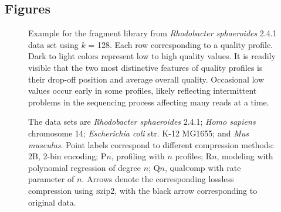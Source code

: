 \documentclass{bmcart}
\begin{document}
\begin{backmatter}



\section*{Figures}
\begin{figure}[h!]
\caption{ Example for the fragment library from
  \textit{Rhodobacter sphaeroides} 2.4.1 data set using $k$ =
  128. Each row corresponding to a quality profile. Dark to light
  colors represent low to high quality values. It is readily visible
  that the two most distinctive features of quality profiles is their
  drop-off position and average overall quality. Occasional low values
  occur early in some profiles, likely reflecting intermittent
  problems in the sequencing process affecting many reads at a time.}
  \label{fig:profiles_128}
\end{figure}

\begin{figure*}[h!]
\caption{ The data sets are \textit{Rhodobacter
    sphaeroides} 2.4.1; \textit{Homo sapiens} chromosome 14;
  \textit{Escherichia coli} str. K-12 MG1655; and \textit{Mus
    musculus}. Point labels correspond to different compression
  methods: 2B, 2-bin encoding; P$n$, profiling with $n$ profiles;
  R$n$, modeling with polynomial regression of degree $n$; Q$n$,
  \textsc{q}ual\textsc{c}omp with rate parameter of $n$. Arrows denote
  the corresponding lossless compression using \textsc{bz}ip2, with
  the black arrow corresponding to original data.}
\label{fig:mse_vs_bpbp}
\end{figure*}


\end{backmatter}
\end{document}
